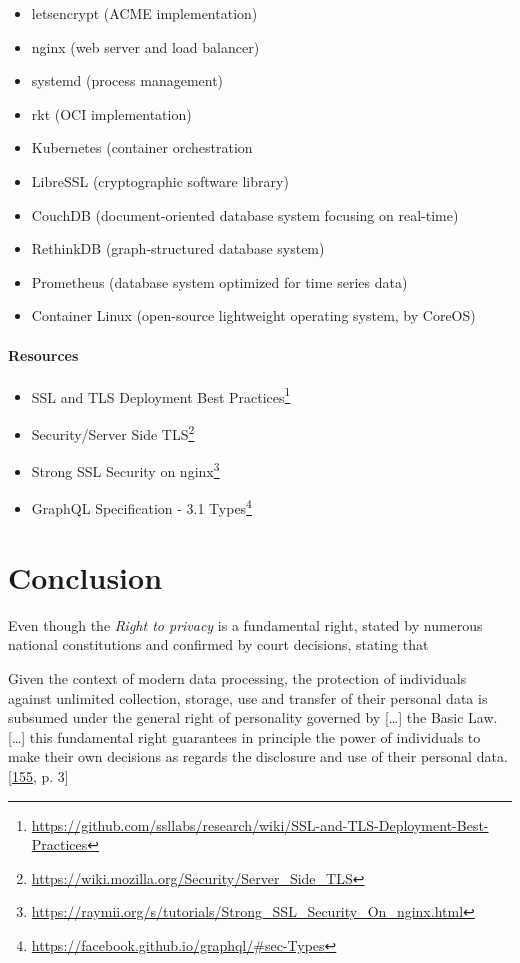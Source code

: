 \documentclass[12pt,english,a4paper,titlepage,cleardoublepage=empty,dottedtoc]{report}
\renewcommand{\href}[2]{#2\footnote{\url{#1}}}
\providecommand{\tightlist}{%
  \setlength{\itemsep}{0pt}\setlength{\parskip}{0pt}}
\let\origquote\quote
\let\endorigquote\endquote
\renewenvironment{quote}{%
    \origquote
    \itshape
}
{\endorigquote}
\begin{document}
\begin{itemize}
\tightlist
\item
  letsencrypt (ACME implementation)
\item
  nginx (web server and load balancer)
\item
  systemd (process management)
\item
  rkt (OCI implementation)
\item
  Kubernetes (container orchestration
\item
  LibreSSL (cryptographic software library)
\item
  CouchDB (document-oriented database system focusing on real-time)
\item
  RethinkDB (graph-structured database system)
\item
  Prometheus (database system optimized for time series data)
\item
  Container Linux (open-source lightweight operating system, by CoreOS)
\end{itemize}

\subsubsection*{Resources}\label{resources}

\begin{itemize}
\tightlist
\item
  \href{https://github.com/ssllabs/research/wiki/SSL-and-TLS-Deployment-Best-Practices}{SSL
  and TLS Deployment Best Practices}
\item
  \href{https://wiki.mozilla.org/Security/Server_Side_TLS}{Security/Server
  Side TLS}
\item
  \href{https://raymii.org/s/tutorials/Strong_SSL_Security_On_nginx.html}{Strong
  SSL Security on nginx}
\item
  \href{https://facebook.github.io/graphql/\#sec-Types}{GraphQL
  Specification - 3.1 Types}
\end{itemize}

\chapter{Conclusion}\label{conclusion}

Even though the \emph{Right to privacy} is a fundamental right, stated
by numerous national constitutions and confirmed by court decisions,
stating that

\begin{quote}
Given the context of modern data processing, the protection of
individuals against unlimited collection, storage, use and transfer of
their personal data is subsumed under the general right of personality
governed by {[}\ldots{}{]} the Basic Law. {[}\ldots{}{]} this
fundamental right guarantees in principle the power of individuals to
make their own decisions as regards the disclosure and use of their
personal data.
{[}\protect\hyperlink{ref-court-decision_1983_census-act-germany}{155},
p. 3{]}
\end{quote}
\end{document}
